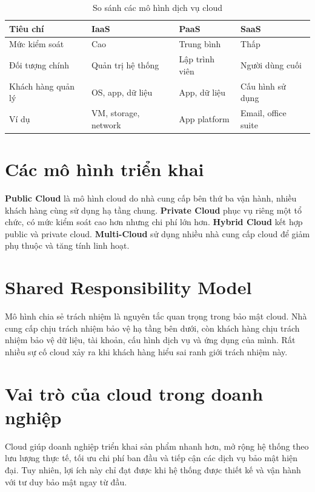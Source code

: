 \begin{table}[H]
\centering
\caption{So sánh các mô hình dịch vụ cloud}
\begin{tabularx}{\textwidth}{|X|X|X|X|}
\hline
\textbf{Tiêu chí} & \textbf{IaaS} & \textbf{PaaS} & \textbf{SaaS} \\
\hline
Mức kiểm soát & Cao & Trung bình & Thấp \\
\hline
Đối tượng chính & Quản trị hệ thống & Lập trình viên & Người dùng cuối \\
\hline
Khách hàng quản lý & OS, app, dữ liệu & App, dữ liệu & Cấu hình sử dụng \\
\hline
Ví dụ & VM, storage, network & App platform & Email, office suite \\
\hline
\end{tabularx}
\end{table}

\section{Các mô hình triển khai}
\textbf{Public Cloud} là mô hình cloud do nhà cung cấp bên thứ ba vận hành, nhiều khách hàng cùng sử dụng hạ tầng chung. \textbf{Private Cloud} phục vụ riêng một tổ chức, có mức kiểm soát cao hơn nhưng chi phí lớn hơn. \textbf{Hybrid Cloud} kết hợp public và private cloud. \textbf{Multi-Cloud} sử dụng nhiều nhà cung cấp cloud để giảm phụ thuộc và tăng tính linh hoạt.

\section{Shared Responsibility Model}
Mô hình chia sẻ trách nhiệm là nguyên tắc quan trọng trong bảo mật cloud. Nhà cung cấp chịu trách nhiệm bảo vệ hạ tầng bên dưới, còn khách hàng chịu trách nhiệm bảo vệ dữ liệu, tài khoản, cấu hình dịch vụ và ứng dụng của mình. Rất nhiều sự cố cloud xảy ra khi khách hàng hiểu sai ranh giới trách nhiệm này.

\section{Vai trò của cloud trong doanh nghiệp}
Cloud giúp doanh nghiệp triển khai sản phẩm nhanh hơn, mở rộng hệ thống theo lưu lượng thực tế, tối ưu chi phí ban đầu và tiếp cận các dịch vụ bảo mật hiện đại. Tuy nhiên, lợi ích này chỉ đạt được khi hệ thống được thiết kế và vận hành với tư duy bảo mật ngay từ đầu.
